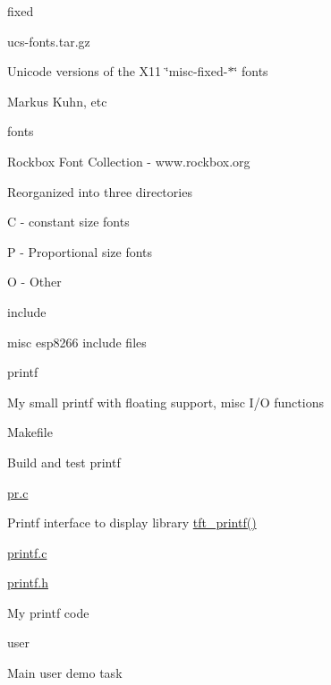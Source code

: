 \begin{DoxyItemize}
\begin{DoxyItemize}
\begin{DoxyItemize}
\begin{DoxyItemize}
\end{DoxyItemize}
\item fixed
\begin{DoxyItemize}
\item ucs-\/fonts.\-tar.\-gz
\item Unicode versions of the X11 \char`\"{}misc-\/fixed-\/$\ast$\char`\"{} fonts
\item Markus Kuhn, etc
\end{DoxyItemize}
\item fonts
\begin{DoxyItemize}
\item Rockbox Font Collection -\/ www.\-rockbox.\-org
\item Reorganized into three directories
\begin{DoxyItemize}
\item C -\/ constant size fonts
\item P -\/ Proportional size fonts
\item O -\/ Other
\end{DoxyItemize}
\end{DoxyItemize}
\end{DoxyItemize}
\end{DoxyItemize}
\item include
\begin{DoxyItemize}
\item misc esp8266 include files
\end{DoxyItemize}
\item printf
\begin{DoxyItemize}
\item My small printf with floating support, misc I/\-O functions
\begin{DoxyItemize}
\item Makefile
\begin{DoxyItemize}
\item Build and test printf
\end{DoxyItemize}
\item \hyperlink{pr_8c}{pr.\-c}
\begin{DoxyItemize}
\item Printf interface to display library \hyperlink{pr_8c_a2d4b0a4bb23937481d2e28522eb7e5eb}{tft\-\_\-printf()}
\end{DoxyItemize}
\item \hyperlink{printf_8c}{printf.\-c}
\item \hyperlink{printf_8h}{printf.\-h}
\begin{DoxyItemize}
\item My printf code
\end{DoxyItemize}
\end{DoxyItemize}
\end{DoxyItemize}
\item user
\begin{DoxyItemize}
\item Main user demo task 
\end{DoxyItemize}
\end{DoxyItemize}